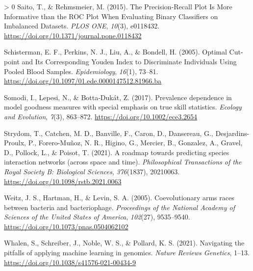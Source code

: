 \documentclass[11pt]{article}
\newlength{\cslhangindent}
\newenvironment{CSLReferences}[3] %
 {%
  \setlength{\parindent}{0pt}
  \ifodd #1 \everypar{\setlength{\hangindent}{\cslhangindent}}\ignorespaces\fi
  \ifnum #2 > 0
  \setlength{\parskip}{#2\baselineskip}
  \fi
 }%
 {}
\begin{document}
\begin{CSLReferences}{1}{0}
\leavevmode\hypertarget{ref-Saito2015PrePlo}{}%
Saito, T., \& Rehmsmeier, M. (2015). The Precision-Recall Plot Is More
Informative than the ROC Plot When Evaluating Binary Classifiers on
Imbalanced Datasets. \emph{PLOS ONE}, \emph{10}(3), e0118432.
\url{https://doi.org/10.1371/journal.pone.0118432}

\leavevmode\hypertarget{ref-Schisterman2005OptCut}{}%
Schisterman, E. F., Perkins, N. J., Liu, A., \& Bondell, H. (2005).
Optimal Cut-point and Its Corresponding Youden Index to Discriminate
Individuals Using Pooled Blood Samples. \emph{Epidemiology},
\emph{16}(1), 73--81.
\url{https://doi.org/10.1097/01.ede.0000147512.81966.ba}

\leavevmode\hypertarget{ref-Somodi2017PreDep}{}%
Somodi, I., Lepesi, N., \& Botta‐Dukát, Z. (2017). Prevalence dependence
in model goodness measures with special emphasis on true skill
statistics. \emph{Ecology and Evolution}, \emph{7}(3), 863--872.
\url{https://doi.org/10.1002/ece3.2654}

\leavevmode\hypertarget{ref-Strydom2021RoaPre}{}%
Strydom, T., Catchen, M. D., Banville, F., Caron, D., Dansereau, G.,
Desjardins-Proulx, P., Forero-Muñoz, N. R., Higino, G., Mercier, B.,
Gonzalez, A., Gravel, D., Pollock, L., \& Poisot, T. (2021). A roadmap
towards predicting species interaction networks (across space and time).
\emph{Philosophical Transactions of the Royal Society B: Biological
Sciences}, \emph{376}(1837), 20210063.
\url{https://doi.org/10.1098/rstb.2021.0063}

\leavevmode\hypertarget{ref-Weitz2005CoeArm}{}%
Weitz, J. S., Hartman, H., \& Levin, S. A. (2005). Coevolutionary arms
races between bacteria and bacteriophage. \emph{Proceedings of the
National Academy of Sciences of the United States of America},
\emph{102}(27), 9535--9540.
\url{https://doi.org/10.1073/pnas.0504062102}

\leavevmode\hypertarget{ref-Whalen2021NavPit}{}%
Whalen, S., Schreiber, J., Noble, W. S., \& Pollard, K. S. (2021).
Navigating the pitfalls of applying machine learning in genomics.
\emph{Nature Reviews Genetics}, 1--13.
\url{https://doi.org/10.1038/s41576-021-00434-9}

\end{CSLReferences}
\end{document}
